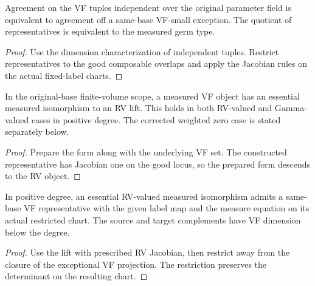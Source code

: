\begin{remark}
\label{rem:measured-germs}
\leanok
Agreement on the VF tuples independent over the original
parameter field is equivalent to agreement off a same-base
VF-small exception. The quotient of representatives is
equivalent to the measured germ type.
\end{remark}
\begin{proof}
\leanok
{}
Use the dimension characterization of independent tuples.
Restrict representatives to the good composable overlaps and
apply the Jacobian rules on the actual fixed-label charts.
\end{proof}

\begin{theorem}
\label{thm:measured-objects}
\leanok
In the original-base finite-volume scope, a measured VF object has
an essential measured isomorphism to an RV lift. This holds in
both RV-valued and Gamma-valued cases in positive degree. The corrected
weighted zero case is stated separately below.
\end{theorem}
\begin{proof}
\leanok
{}
Prepare the form along with the underlying VF set. The constructed
representative has Jacobian one on the good locus, so the prepared
form descends to the RV object.
\end{proof}

\begin{theorem}
\label{thm:measured-isomorphisms-rv}
\leanok
In positive degree, an essential RV-valued measured isomorphism admits a same-base VF
representative with the given label map and the measure equation
on its actual restricted chart. The source and target complements
have VF dimension below the degree.
\end{theorem}
\begin{proof}
\leanok
{}
Use the lift with prescribed RV Jacobian, then restrict away
from the closure of the exceptional VF projection. The restriction
preserves the determinant on the resulting chart.
\end{proof}

